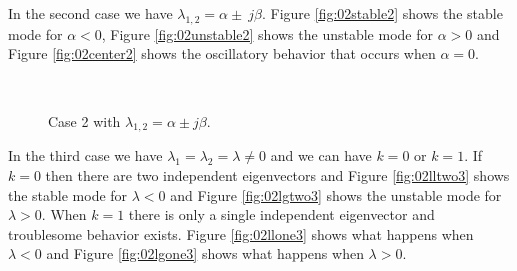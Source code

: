 In the second case we have $\lambda_{1,2}=\alpha\pm\ j\beta$. Figure \ref{fig:02stable2} shows the stable mode for $\alpha<0$, Figure \ref{fig:02unstable2} shows the unstable mode for $\alpha>0$ and Figure \ref{fig:02center2} shows the oscillatory behavior that occurs when $\alpha=0$.

\begin{figure}[ht!]
  \centering
   \hfill
   \\
  \caption{Case 2 with $\lambda_{1,2} = \alpha\pm j\beta$.}
  \label{fig:02case2}
\end{figure}

In the third case we have $\lambda_1=\lambda_2=\lambda\neq0$ and we can have $k=0$ or $k=1$. If $k=0$ then there are two independent eigenvectors and Figure \ref{fig:02lltwo3} shows the stable mode for $\lambda<0$ and Figure \ref{fig:02lgtwo3} shows the unstable mode for $\lambda>0$. When $k=1$ there is only a single independent eigenvector and troublesome behavior exists. Figure \ref{fig:02llone3} shows what happens when $\lambda<0$ and Figure \ref{fig:02lgone3} shows what happens when $\lambda>0$.


